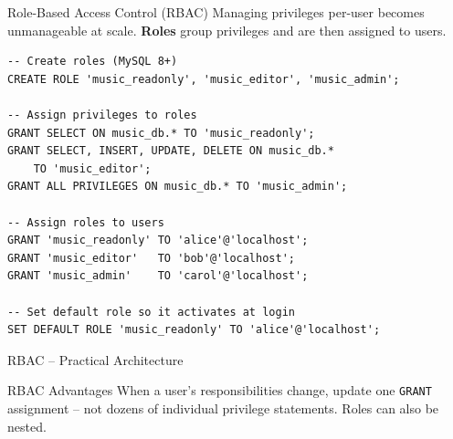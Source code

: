 \begin{frame}[fragile]{Role-Based Access Control (RBAC)}
  Managing privileges per-user becomes unmanageable at scale.
  \textbf{Roles} group privileges and are then assigned to users.

  \begin{lstlisting}[style=sqlstyle]
-- Create roles (MySQL 8+)
CREATE ROLE 'music_readonly', 'music_editor', 'music_admin';

-- Assign privileges to roles
GRANT SELECT ON music_db.* TO 'music_readonly';
GRANT SELECT, INSERT, UPDATE, DELETE ON music_db.*
    TO 'music_editor';
GRANT ALL PRIVILEGES ON music_db.* TO 'music_admin';

-- Assign roles to users
GRANT 'music_readonly' TO 'alice'@'localhost';
GRANT 'music_editor'   TO 'bob'@'localhost';
GRANT 'music_admin'    TO 'carol'@'localhost';

-- Set default role so it activates at login
SET DEFAULT ROLE 'music_readonly' TO 'alice'@'localhost';
  \end{lstlisting}
\end{frame}

\begin{frame}{RBAC -- Practical Architecture}
  \begin{center}
  \end{center}

  \begin{block}{RBAC Advantages}
    When a user's responsibilities change, update one \texttt{GRANT} assignment -- not
    dozens of individual privilege statements. Roles can also be nested.
  \end{block}
\end{frame}
